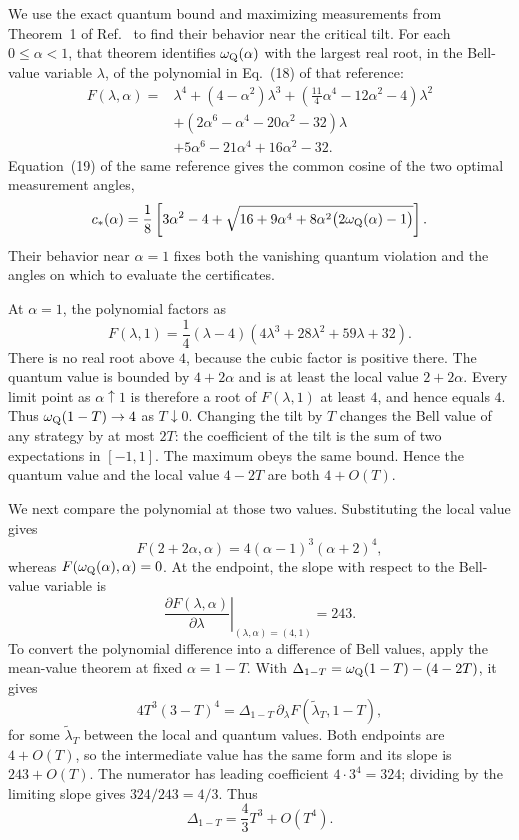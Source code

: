 \documentclass[aps,prl,onecolumn,10pt,superscriptaddress,nofootinbib,longbibliography]{revtex4-2}
\theoremstyle{remark}
\begin{document}
We use the exact quantum bound and maximizing measurements from
Theorem~1 of Ref.~\cite{GigenaEtAl2025} to find their behavior near the
critical tilt. For each $0\leq\alpha<1$, that theorem identifies
$\omega_{\rm Q}(\alpha)$ with the largest real root, in the Bell-value
variable $\lambda$, of the polynomial in Eq.~(18) of that reference:
\begin{align}
F(\lambda,\alpha)={}&\lambda^4+(4-\alpha^2)\lambda^3
+\left(\frac{11}{4}\alpha^4-12\alpha^2-4\right)\lambda^2
\nonumber\\
&+\left(2\alpha^6-\alpha^4-20\alpha^2-32\right)\lambda
\nonumber\\
&+5\alpha^6-21\alpha^4+16\alpha^2-32.
\label{supp:eq:exact-quartic}
\end{align}
Equation~(19) of the same reference gives the common cosine of the two optimal measurement angles,
\begin{equation}
c_*(\alpha)=\frac18\left[3\alpha^2-4+
\sqrt{16+9\alpha^4+8\alpha^2\bigl(2\omega_{\rm Q}(\alpha)-1\bigr)}\right].
\label{supp:eq:exact-optimal-cosine}
\end{equation}
Their behavior near $\alpha=1$ fixes both the vanishing quantum violation and the angles on which to evaluate the certificates.

At $\alpha=1$, the polynomial factors as
\begin{equation}
F(\lambda,1)=\frac14(\lambda-4)
\left(4\lambda^3+28\lambda^2+59\lambda+32\right).
\label{supp:eq:quartic-factor-endpoint}
\end{equation}
There is no real root above $4$, because the cubic factor is positive
there. The quantum value is bounded by $4+2\alpha$ and is at least the
local value $2+2\alpha$. Every limit point as $\alpha\uparrow1$ is
therefore a root of $F(\lambda,1)$ at least $4$, and hence equals $4$.
Thus $\omega_{\rm Q}(1-T)\to4$ as $T\downarrow0$.
Changing the tilt by $T$ changes the Bell value of any strategy by at most
$2T$: the coefficient of the tilt is the sum of two expectations in
$[-1,1]$. The maximum obeys the same bound. Hence the quantum value and
the local value $4-2T$ are both $4+O(T)$.

We next compare the polynomial at those two values. Substituting the
local value gives
\[
F(2+2\alpha,\alpha)=4(\alpha-1)^3(\alpha+2)^4,
\]
whereas $F(\omega_{\rm Q}(\alpha),\alpha)=0$.
At the endpoint, the slope with respect to the Bell-value variable is
\begin{equation}
\left.\frac{\partial F(\lambda,\alpha)}{\partial\lambda}
\right|_{(\lambda,\alpha)=(4,1)}=243.
\label{supp:eq:simple-root}
\end{equation}
To convert the polynomial difference into a difference of Bell values,
apply the mean-value theorem at fixed $\alpha=1-T$. With
$\Delta_{1-T}=\omega_{\rm Q}(1-T)-(4-2T)$, it gives
\[
4T^3(3-T)^4
=\Delta_{1-T}\,\partial_\lambda F(\widetilde\lambda_T,1-T),
\]
for some $\widetilde\lambda_T$ between the local and quantum values.
Both endpoints are $4+O(T)$, so the intermediate value has the same form
and its slope is $243+O(T)$. The numerator has leading coefficient $4\cdot3^4=324$; dividing by the limiting slope gives $324/243=4/3$. Thus
\[
\Delta_{1-T}=\frac43T^3+O(T^4).
\]
\end{document}

